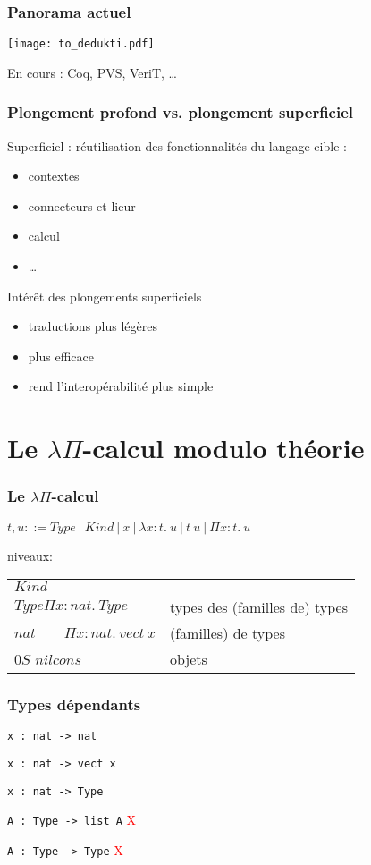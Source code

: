 \documentclass[12pt,aspectratio=169]{beamer}
\begin{document}
\begin{frame}
  \frametitle{Panorama actuel}
  \texttt{[image: to\_dedukti.pdf]}
  
  En cours : Coq, PVS, VeriT, \dots
\end{frame}

\begin{frame}
  \frametitle{Plongement profond vs. plongement superficiel}
  Superficiel : réutilisation des fonctionnalités du langage cible :
\begin{itemize}
\item contextes
\item connecteurs et lieur
\item calcul
\item \dots
\end{itemize}
\bigskip

Intérêt des plongements superficiels
\begin{itemize}
\item traductions plus légères
\item plus efficace
\item rend l'interopérabilité plus simple
\end{itemize}

\end{frame}

\section{Le $\lambda\Pi$-calcul modulo théorie}




\begin{frame}
  \frametitle{Le $\lambda\Pi$-calcul}
  $t,u ::= Type~|~Kind~|~x~|~\lambda x:t.~u~|~t~u~|~\Pi x:t.~u$
  \bigskip
  
  niveaux:
  \begin{tabular}[t]{ll}
    $Kind$\\
    $Type$\qquad $\Pi x:nat.~Type$&types des (familles de) types\\
    $nat\qquad \Pi x:nat.~vect~x$&(familles) de types\\
    0\qquad $S$ \qquad$nil$\qquad$cons$ & objets
  \end{tabular}
  
\end{frame}

\begin{frame}[fragile]
  \frametitle{Types dépendants}
 \lstinline!x : nat -> nat! \textcolor{green}{\checkmark}
 \medskip
 
 \lstinline!x : nat -> vect x! \textcolor{green}{\checkmark}
\medskip
 
 \lstinline!x : nat -> Type! \textcolor{green}{\checkmark}
\medskip
 
 \lstinline!A : Type -> list A! \textcolor{red}{X}
\medskip
 
 \lstinline!A : Type -> Type! \textcolor{red}{X}
\end{frame}
\end{document}
